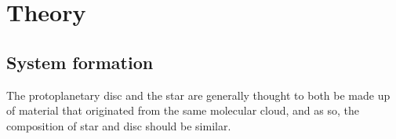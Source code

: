 \documentclass[a4paper,twocolumn,12pt]{article}
\begin{document}




\section{Theory}
\label{section: Theory}

%
%
%

\subsection{System formation}
\label{subsection: System formation}
The protoplanetary disc and the star are generally thought to both be made up of material that originated from the same molecular cloud, and as so, the composition of star and disc should be similar.%

\end{document}
